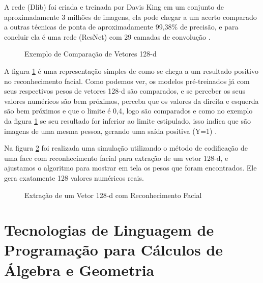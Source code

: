 A rede (Dlib) foi criada e treinada por Davis King em um conjunto de aproximadamente 3 milhões de imagens, ela pode chegar a um acerto comparado a outras técnicas de ponta de aproximadamente 99,38\% de precisão, e para concluir ela é uma rede (ResNet) com 29 camadas de convolução \cite{dlib1}.
\begin{figure}[H]
	\centering
	\caption{Exemplo de Comparação de Vetores 128-d}
	\fontsize{9pt}{12pt}\selectfont
	\def\svgwidth{13cm}
	
	\label{fig:exetrein}
\end{figure}

A figura \ref{fig:exetrein} é uma representação simples de como se chega a um resultado positivo no reconhecimento facial. Como podemos ver, os modelos pré-treinados já com seus respectivos pesos de vetores 128-d são comparados, e se perceber os seus valores numéricos são bem próximos, perceba que os valores da direita e esquerda são bem próximos e que o limite é 0,4, logo são comparados e como no exemplo da figura \ref{fig:exetrein} se seu resultado for inferior ao limite estipulado, isso indica que são imagens de uma mesma pessoa, gerando uma saída positiva (Y=1) \cite{adamgeitgey}.

Na figura \ref{fig:ext128d} foi realizada uma simulação utilizando o método de codificação de uma face com reconhecimento facial para extração de um vetor 128-d, e ajustamos o algoritmo para mostrar em tela os pesos que foram encontrados. Ele gera exatamente 128 valores numéricos reais. 

\begin{figure}[H]
	\centering
	\caption{Extração de um Vetor 128-d com Reconhecimento Facial}
	\fontsize{9pt}{12pt}\selectfont
	\def\svgwidth{11cm}
	
	\label{fig:ext128d}
\end{figure}

\section{Tecnologias de Linguagem de Programação para Cálculos de Álgebra e Geometria}

